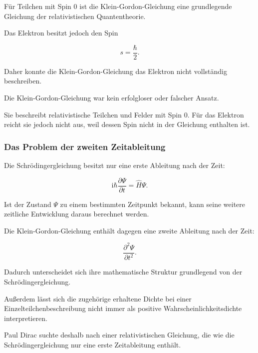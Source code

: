 Für Teilchen mit Spin \(0\) ist die Klein-Gordon-Gleichung eine
grundlegende Gleichung der relativistischen Quantentheorie.

Das Elektron besitzt jedoch den Spin

\begin{equation}
	s
	=
	\frac{\hbar}{2}.
\end{equation}

Daher konnte die Klein-Gordon-Gleichung das Elektron nicht vollständig
beschreiben.

\begin{PhysicsBox}
	\label{box:bedeutung_klein_gordon_weg_dirac}
	
	Die Klein-Gordon-Gleichung war kein erfolgloser oder falscher Ansatz.
	
	Sie beschreibt relativistische Teilchen und Felder mit Spin \(0\).
	Für das Elektron reicht sie jedoch nicht aus, weil dessen Spin nicht in
	der Gleichung enthalten ist.
\end{PhysicsBox}

\subsubsection*{Das Problem der zweiten Zeitableitung}

Die Schrödingergleichung besitzt nur eine erste Ableitung nach der Zeit:

\begin{equation}
	\mathrm{i}\hbar
	\frac{\partial\Psi}{\partial t}
	=
	\hat{H}\Psi.
\end{equation}

Ist der Zustand \(\Psi\) zu einem bestimmten Zeitpunkt bekannt, kann
seine weitere zeitliche Entwicklung daraus berechnet werden.

Die Klein-Gordon-Gleichung enthält dagegen eine zweite Ableitung nach
der Zeit:

\begin{equation}
	\frac{\partial^2\Psi}{\partial t^2}.
\end{equation}

Dadurch unterscheidet sich ihre mathematische Struktur grundlegend von
der Schrödingergleichung.

Außerdem lässt sich die zugehörige erhaltene Dichte bei einer
Einzelteilchenbeschreibung nicht immer als positive
Wahrscheinlichkeitsdichte interpretieren.

Paul Dirac suchte deshalb nach einer relativistischen
Gleichung, die wie die Schrödingergleichung nur eine erste
Zeitableitung enthält.

